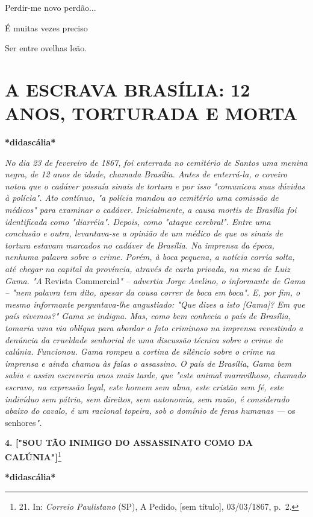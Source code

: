Perdir-me novo perdão...

É muitas vezes preciso

Ser entre ovelhas leão.

\part{A ESCRAVA BRASÍLIA: 12 ANOS, TORTURADA E MORTA}

\textbf{*didascália*}

\emph{No dia 23 de fevereiro de 1867, foi enterrada no cemitério de
Santos uma menina negra, de 12 anos de idade, chamada Brasília. Antes de
enterrá-la, o coveiro notou que o cadáver possuía sinais de tortura e
por isso "comunicou suas dúvidas à polícia". Ato contínuo, "a polícia
mandou ao cemitério uma comissão de médicos" para examinar o cadáver.
Inicialmente, a causa mortis de Brasília foi identificada como
"diarréia". Depois, como "ataque cerebral". Entre uma conclusão e outra,
levantava-se a opinião de um médico de que os sinais de tortura estavam
marcados no cadáver de Brasília. Na imprensa da época, nenhuma palavra
sobre o crime. Porém, à boca pequena, a notícia corria solta, até chegar
na capital da província, através de carta privada, na mesa de Luiz Gama.
"A} Revista Commercial\emph{" -- advertia Jorge Avelino, o informante de
Gama -- "nem palavra tem dito, apesar da cousa correr de boca em boca".
E, por fim, o mesmo informante perguntava-lhe angustiado: "Que dizes a
isto {[}Gama{]}? Em que país vivemos?" Gama se indigna. Mas, como bem
conhecia o país de Brasília, tomaria uma via oblíqua para abordar o fato
criminoso na imprensa revestindo a denúncia da crueldade senhorial de
uma discussão técnica sobre o crime de calúnia. Funcionou. Gama rompeu a
cortina de silêncio sobre o crime na imprensa e ainda chamou às falas o
assassino. O país de Brasília, Gama bem sabia e assim escreveria anos
mais tarde, que "este animal maravilhoso, chamado escravo, na expressão
legal, este homem sem alma, este cristão sem fé, este indivíduo sem
pátria, sem direitos, sem autonomia, sem razão, é considerado abaixo do
cavalo, é um racional topeira, sob o domínio de feras humanas ---} os
senhores\emph{".}

\textbf{4. {[}"SOU TÃO INIMIGO DO ASSASSINATO COMO DA
CALÚNIA"{]}}\footnote{21. In: \emph{Correio Paulistano} (SP), A Pedido,
  {[}sem título{]}, 03/03/1867, p.~2.}

\textbf{*didascália*}

